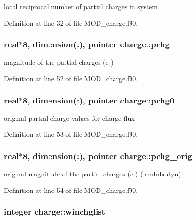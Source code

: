 local reciprocal number of partial charges in system 



Definition at line 32 of file M\-O\-D\-\_\-charge.\-f90.

\hypertarget{classcharge_a2cb76937e7223fd4b2e2e99ae6631975}{
\subsubsection[{pchg}]{\setlength{\rightskip}{0pt plus 5cm}real$\ast$8, dimension(\-:), pointer charge\-::pchg}}\label{classcharge_a2cb76937e7223fd4b2e2e99ae6631975}


magnitude of the partial charges (e-\/) 



Definition at line 52 of file M\-O\-D\-\_\-charge.\-f90.

\hypertarget{classcharge_aa39cba77554acd7c00e2aec7c234a2d5}{
\subsubsection[{pchg0}]{\setlength{\rightskip}{0pt plus 5cm}real$\ast$8, dimension(\-:), pointer charge\-::pchg0}}\label{classcharge_aa39cba77554acd7c00e2aec7c234a2d5}


original partial charge values for charge flux 



Definition at line 53 of file M\-O\-D\-\_\-charge.\-f90.

\hypertarget{classcharge_aabdfa076eef62682b69ee6cc1ec5dda2}{
\subsubsection[{pchg\-\_\-orig}]{\setlength{\rightskip}{0pt plus 5cm}real$\ast$8, dimension(\-:), pointer charge\-::pchg\-\_\-orig}}\label{classcharge_aabdfa076eef62682b69ee6cc1ec5dda2}


original magnitude of the partial charges (e-\/) (lambda dyn) 



Definition at line 54 of file M\-O\-D\-\_\-charge.\-f90.

\hypertarget{classcharge_aec7304bdb32da675589efb079cc02942}{
\subsubsection[{winchglist}]{\setlength{\rightskip}{0pt plus 5cm}integer charge\-::winchglist}}\label{classcharge_aec7304bdb32da675589efb079cc02942}


